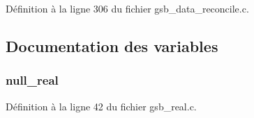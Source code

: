 Définition à la ligne 306 du fichier gsb\_\-data\_\-reconcile.c.



\subsection{Documentation des variables}
\subsubsection[{null\_\-real}]{ {\bf null\_\-real}}\label{gsb__data__reconcile_8c_a26f304bec3fdc0651b9aa8765d4de3c6}


Définition à la ligne 42 du fichier gsb\_\-real.c.

